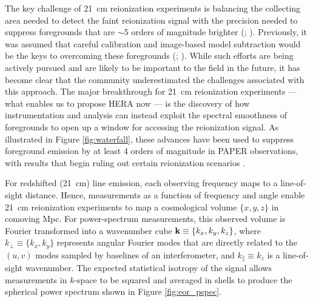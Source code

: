 \documentclass[preprint]{aastex}
\newcommand{\Mycitep}[1]{{\bf \citep{#1}}}
\newcommand{\Mycitealt}[1]{{\bf \citealt{#1}}}
\def\kperp{k_{\bot}}
\def\kpar{k_{\|}}
\def\kperp{k_{\bot}}
\def\kpar{k_{\|}}
\def\k{{\bf k}}
\begin{document}
The key challenge of 21~cm reionization experiments is 
balancing the collecting area needed to detect the faint reionization signal
with the precision needed to suppress
foregrounds that are $\sim$5 orders of magnitude brighter (\Mycitealt{deoliveira2008}; \citealt{jelic_et_al2008}).
Previously, it was assumed that careful calibration and image-based model subtraction would be the keys to overcoming these foregrounds
(\Mycitealt{liu_et_al2008,juddEarly}; \citealt{harker_et_al2009}).
While such efforts are being actively pursued and are likely to be important to the field in the future,
it has become clear that the community underestimated the challenges associated with this approach.
The major breakthrough for 21~cm reionization experiments --- what enables us to propose HERA now --- is 
the discovery of how 
instrumentation and analysis can instead exploit the 
spectral smoothness of foregrounds 
to open up a window for accessing the reionization signal. 
As illustrated in Figure \ref{fig:waterfall}, these advances have been used to suppress foreground emission by at least 4
orders of magnitude in PAPER observations,
with results that begin ruling out certain reionization scenarios
\Mycitep{parsons_et_al2013}.

For redshifted (21~cm) line emission, each observing frequency maps to
a line-of-sight distance.  Hence, measurements as a function of frequency and angle 
enable 21~cm reionization experiments to map a cosmological volume $\{x,y,z\}$ in
comoving Mpc.  For power-spectrum measurements, this observed volume is Fourier transformed into a 
wavenumber cube $\k\equiv\{k_{x}, k_{y}, k_{z}\}$, where 
$\kperp\equiv\{k_{x},k_{y}\}$ represents angular Fourier modes that are directly
related to the $(u,v)$ modes sampled by baselines of an interferometer, and $\kpar\equiv k_{z}$ is
a line-of-sight wavenumber.
The expected statistical isotropy of the signal allows measurements in $k$-space to be
squared and averaged in shells to produce the spherical power spectrum
shown in Figure \ref{fig:eor_pspec}.
\end{document}

